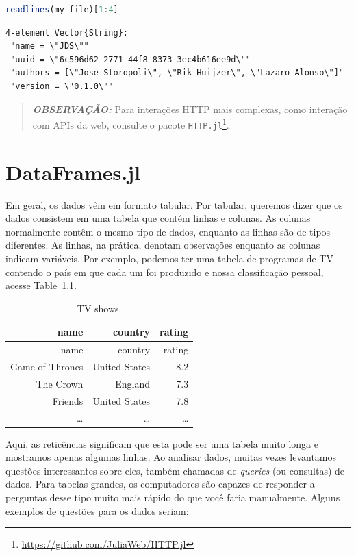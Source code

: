 \documentclass[
  notoc %
]{tufte-book}
\DeclareRobustCommand{\href}[2]{#2\footnote{\url{#1}}}
\newcommand{\passthrough}[1]{#1}
\begin{document}
\begin{lstlisting}[language=Julia]
readlines(my_file)[1:4]
\end{lstlisting}

\begin{lstlisting}[language=Output]
4-element Vector{String}:
 "name = \"JDS\""
 "uuid = \"6c596d62-2771-44f8-8373-3ec4b616ee9d\""
 "authors = [\"Jose Storopoli\", \"Rik Huijzer\", \"Lazaro Alonso\"]"
 "version = \"0.1.0\""
\end{lstlisting}

\begin{quote}
\textbf{\emph{OBSERVAÇÃO:}} Para interações HTTP mais complexas, como
interação com APIs da web, consulte o pacote
\href{https://github.com/JuliaWeb/HTTP.jl}{\passthrough{\lstinline!HTTP.jl!}}.
\end{quote}

\hypertarget{sec:dataframes}{%
\chapter{DataFrames.jl}\label{sec:dataframes}}

Em geral, os dados vêm em formato tabular. Por tabular, queremos dizer
que os dados consistem em uma tabela que contém linhas e colunas. As
colunas normalmente contêm o mesmo tipo de dados, enquanto as linhas são
de tipos diferentes. As linhas, na prática, denotam observações enquanto
as colunas indicam variáveis. Por exemplo, podemos ter uma tabela de
programas de TV contendo o país em que cada um foi produzido e nossa
classificação pessoal, acesse Table~\ref{tbl:TV_shows}.

\hypertarget{tbl:TV_shows}{}
\begin{longtable}[]{@{}rrr@{}}
\caption{\label{tbl:TV_shows}TV shows.}\tabularnewline
\toprule
name & country & rating \\
\midrule
\endfirsthead
\toprule
name & country & rating \\
\midrule
\endhead
Game of Thrones & United States & 8.2 \\
The Crown & England & 7.3 \\
Friends & United States & 7.8 \\
\ldots{} & \ldots{} & \ldots{} \\
\bottomrule
\end{longtable}

Aqui, as reticências significam que esta pode ser uma tabela muito longa
e mostramos apenas algumas linhas. Ao analisar dados, muitas vezes
levantamos questões interessantes sobre eles, também chamadas de
\emph{queries} (ou consultas) de dados. Para tabelas grandes, os
computadores são capazes de responder a perguntas desse tipo muito mais
rápido do que você faria manualmente. Alguns exemplos de questões para
os dados seriam:
\end{document}
